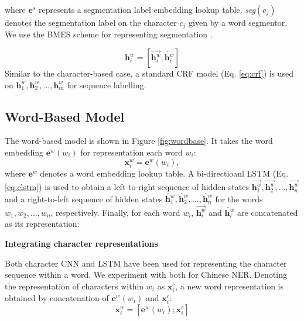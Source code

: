 \documentclass[11pt,a4paper]{article}
\begin{document}
\begin{CJK*}{UTF8}{gbsn}
where $\textbf{e}^s$ represents a segmentation label embedding lookup table. \textit{seg}$(c_j)$ denotes the segmentation label on the character $c_j$ given by a word segmentor. We use the BMES scheme for representing segmentation \cite{xue2003Chinese}.



\begin{equation}
\textbf{h}_i^w = [\overrightarrow{\textbf{h}_i^w};\overleftarrow{\textbf{h}_i^w}]
\end{equation}
Similar to the character-based case, a standard CRF model (Eq. \ref{eq:crf}) is used on $\textbf{h}^w_1, \textbf{h}^w_2,\ldots,\textbf{h}^w_m$ for sequence labelling. 


\subsection{Word-Based Model}\label{sec:word-based}
The word-based model is shown in Figure \ref{fig:wordbase}. It takes the word embedding $\textbf{e}^w(w_i)$ for representation each word $w_i$:
\begin{equation}\label{eq:xi}
\textbf{x}^w_i = \textbf{e}^w(w_i),
\end{equation}
where $\textbf{e}^w$ denotes a word embedding lookup table.
A bi-directioanl LSTM (Eq. \ref{eq:clstm}) is used to obtain a left-to-right sequence of hidden states $\overrightarrow{\textbf{h}_1^w}, \overrightarrow{\textbf{h}_2^w}, \ldots, \overrightarrow{\textbf{h}_n^w}$ and a right-to-left sequence of hidden states $\overleftarrow{\textbf{h}_1^w}, \overleftarrow{\textbf{h}_2^w}, \ldots, \overleftarrow{\textbf{h}_n^w}$ for the words $w_1, w_2, \ldots, w_n$, respectively. Finally, for each word $w_i$, $\overrightarrow{\textbf{h}_i^w}$ and $\overleftarrow{\textbf{h}_i^w}$ are concatenated as its representation:




\textbf{Integrating character representations}

Both character CNN \cite{ma2016end} and LSTM \cite{lample2016neural} have been used for representing the character sequence within a word. We experiment with both for Chinese NER. Denoting the representation of characters within $w_i$ as $\textbf{x}^c_i$, a new word representation is obtained by concatenation of $\textbf{e}^w(w_i)$ and $\textbf{x}^c_i$:
\begin{equation}
\textbf{x}^w_i = [\textbf{e}^w(w_i); \textbf{x}^c_i]
\end{equation}



\end{CJK*}
\end{document}

